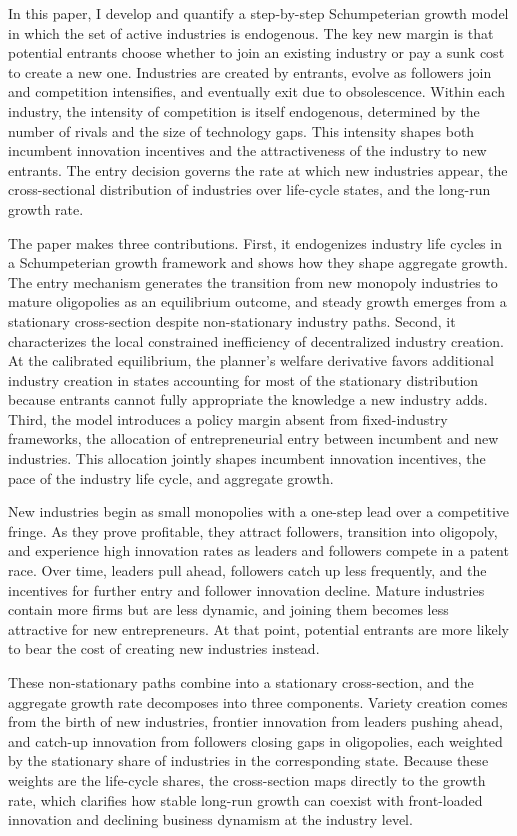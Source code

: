 \documentclass[12pt]{article}
\begin{document}
In this paper, I develop and quantify a step-by-step Schumpeterian growth model in which the set of active industries is endogenous. The key new margin is that potential entrants choose whether to join an existing industry or pay a sunk cost to create a new one. Industries are created by entrants, evolve as followers join and competition intensifies, and eventually exit due to obsolescence. Within each industry, the intensity of competition is itself endogenous, determined by the number of rivals and the size of technology gaps. This intensity shapes both incumbent innovation incentives and the attractiveness of the industry to new entrants. The entry decision governs the rate at which new industries appear, the cross-sectional distribution of industries over life-cycle states, and the long-run growth rate.

The paper makes three contributions. First, it endogenizes industry life cycles in a Schumpeterian growth framework and shows how they shape aggregate growth. The entry mechanism generates the transition from new monopoly industries to mature oligopolies as an equilibrium outcome, and steady growth emerges from a stationary cross-section despite non-stationary industry paths. Second, it characterizes the local constrained inefficiency of decentralized industry creation. At the calibrated equilibrium, the planner's welfare derivative favors additional industry creation in states accounting for most of the stationary distribution because entrants cannot fully appropriate the knowledge a new industry adds. Third, the model introduces a policy margin absent from fixed-industry frameworks, the allocation of entrepreneurial entry between incumbent and new industries. This allocation jointly shapes incumbent innovation incentives, the pace of the industry life cycle, and aggregate growth.

New industries begin as small monopolies with a one-step lead over a competitive fringe. As they prove profitable, they attract followers, transition into oligopoly, and experience high innovation rates as leaders and followers compete in a patent race. Over time, leaders pull ahead, followers catch up less frequently, and the incentives for further entry and follower innovation decline. Mature industries contain more firms but are less dynamic, and joining them becomes less attractive for new entrepreneurs. At that point, potential entrants are more likely to bear the cost of creating new industries instead.

These non-stationary paths combine into a stationary cross-section, and the aggregate growth rate decomposes into three components. Variety creation comes from the birth of new industries, frontier innovation from leaders pushing ahead, and catch-up innovation from followers closing gaps in oligopolies, each weighted by the stationary share of industries in the corresponding state. Because these weights are the life-cycle shares, the cross-section maps directly to the growth rate, which clarifies how stable long-run growth can coexist with front-loaded innovation and declining business dynamism at the industry level.
\end{document}
